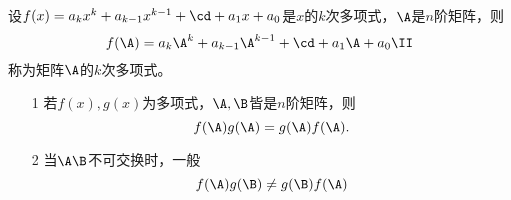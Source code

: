 % 
\begin{dingyi}[矩阵多项式]
  设$f(x)=a_kx^k+a_{k-1}x^{k-1}+\cd+a_1x+a_0$是$x$的$k$次多项式，$\A$是$n$阶矩阵，则
  $$
  f(\A)=a_k\A^k+a_{k-1}\A^{k-1}+\cd+a_1\A+a_0\II
  $$
  称为矩阵$\A$的$k$次多项式。
\end{dingyi}
% 
\begin{zhu*}
  \begin{itemize}
  \item[1] 若$f(x), g(x)$为多项式，$\A,\B$皆是$n$阶矩阵，则
    $$
    f(\A)g(\A) = g(\A)f(\A).
    $$
  \item[2] 当$\A\B$不可交换时，一般
    $$f(\A)g(\B)\ne g(\B)f(\A)$$
  \end{itemize}
\end{zhu*}
